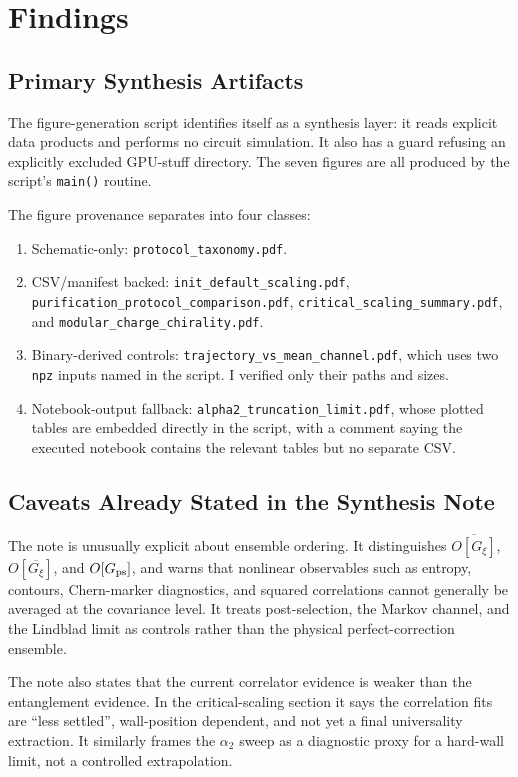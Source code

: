 \documentclass[aps,prb,onecolumn,nofootinbib,superscriptaddress]{revtex4-2}
\begin{document}
\section{Findings}

\subsection{Primary Synthesis Artifacts}

The figure-generation script identifies itself as a synthesis layer: it reads explicit data
products and performs no circuit simulation.  It also has a guard refusing
an explicitly excluded GPU-stuff directory.  The seven figures are all produced by the script's
\texttt{main()} routine.

The figure provenance separates into four classes:
\begin{enumerate}
\item Schematic-only: \texttt{protocol\_taxonomy.pdf}.
\item CSV/manifest backed: \texttt{init\_default\_scaling.pdf},
\texttt{purification\_protocol\_comparison.pdf},
\texttt{critical\_scaling\_summary.pdf}, and \texttt{modular\_charge\_chirality.pdf}.
\item Binary-derived controls: \texttt{trajectory\_vs\_mean\_channel.pdf}, which uses two
\texttt{npz} inputs named in the script.  I verified only their paths and sizes.
\item Notebook-output fallback: \texttt{alpha2\_truncation\_limit.pdf}, whose plotted tables
are embedded directly in the script, with a comment saying the executed notebook contains the
relevant tables but no separate CSV.
\end{enumerate}

\subsection{Caveats Already Stated in the Synthesis Note}

The note is unusually explicit about ensemble ordering.  It distinguishes
$\overline{O[G_\xi]}$, $O[\overline{G_\xi}]$, and $O[G_{\rm ps}]$, and warns that nonlinear
observables such as entropy, contours, Chern-marker diagnostics, and squared correlations
cannot generally be averaged at the covariance level.  It treats post-selection, the Markov
channel, and the Lindblad limit as controls rather than the physical perfect-correction
ensemble.

The note also states that the current correlator evidence is weaker than the entanglement
evidence.  In the critical-scaling section it says the correlation fits are ``less settled'',
wall-position dependent, and not yet a final universality extraction.  It similarly frames the
$\alpha_2$ sweep as a diagnostic proxy for a hard-wall limit, not a controlled extrapolation.
\end{document}
